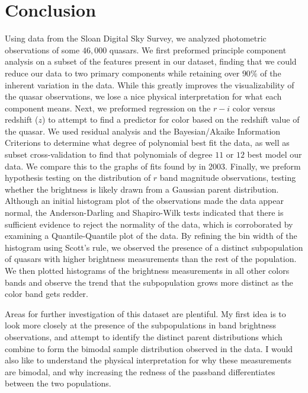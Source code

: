 \chapter{Conclusion}

Using data from the Sloan Digital Sky Survey, we analyzed photometric observations of some $46,000$ quasars. We first preformed principle component analysis on a subset of the features present in our dataset, finding that we could reduce our data to two primary components while retaining over $90\%$ of the inherent variation in the data. While this greatly improves the visualizability of the quasar observations, we lose a nice physical interpretation for what each component means. Next, we preformed regression on the $r - i$ color versus redshift ($z$) to attempt to find a predictor for color based on the redshift value of the quasar. We used residual analysis and the Bayesian/Akaike Information Criterions to determine what degree of polynomial best fit the data, as well as subset cross-validation to find that polynomials of degree $11$ or $12$ best model our data. We compare this to the graphs of fits found by \citeauthor{wu2003} in 2003. Finally, we preform hypothesis testing on the distribution of $r$ band magnitude observations, testing whether the brightness is likely drawn from a Gaussian parent distribution. Although an initial histogram plot of the observations made the data appear normal, the Anderson-Darling and Shapiro-Wilk tests indicated that there is sufficient evidence to reject the normality of the data, which is corroborated by examining a Quantile-Quantile plot of the data. By refining the bin width of the histogram using Scott's rule, we observed the presence of a distinct subpopulation of quasars with higher brightness measurements than the rest of the population. We then plotted histograms of the brightness measurements in all other colors bands and observe the trend that the subpopulation grows more distinct as the color band gets redder.

Areas for further investigation of this dataset are plentiful. My first idea is to look more closely at the presence of the subpopulations in band brightness observations, and attempt to identify the distinct parent distributions which combine to form the bimodal sample distribution observed in the data. I would also like to understand the physical interpretation for why these measurements are bimodal, and why increasing the redness of the passband differentiates between the two populations.